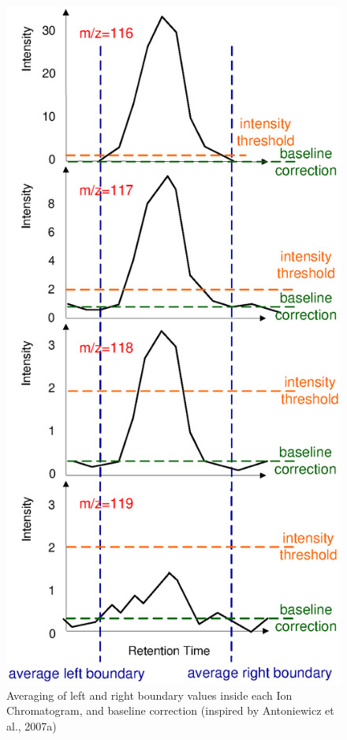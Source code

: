 \begin{figure}
  \begin{center}
    \includegraphics[scale=0.7]{graphics/chapter08/88.eps}
  \end{center}
  \caption{Averaging of left and right boundary values inside each Ion Chromatogram, and baseline correction (inspired by Antoniewicz et al., 2007a)}
  \label{fig:88}
\end{figure}

